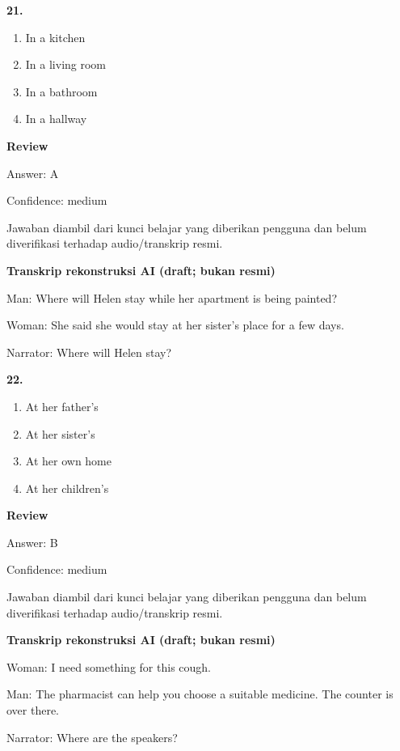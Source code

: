 \documentclass[12pt]{article}
\begin{document}
\noindent\textbf{21.}
\begin{enumerate}[label=(\Alph*),leftmargin=*,itemsep=0.2em]
\item In a kitchen
\item In a living room
\item In a bathroom
\item In a hallway
\end{enumerate}
\par
\begingroup
\setlength{\parskip}{0pt}
\setlength{\parindent}{0pt}
\textbf{Review}\par
Answer: A\par
Confidence: medium\par
Jawaban diambil dari kunci belajar yang diberikan pengguna dan belum diverifikasi terhadap audio/transkrip resmi.\par
\endgroup
\par
\vspace{0.25\baselineskip}
\begin{exampleblock}
\textbf{Transkrip rekonstruksi AI (draft; bukan resmi)}\par
Man: Where will Helen stay while her apartment is being painted?\par
Woman: She said she would stay at her sister's place for a few days.\par
Narrator: Where will Helen stay?\par
\end{exampleblock}
\noindent\textbf{22.}
\begin{enumerate}[label=(\Alph*),leftmargin=*,itemsep=0.2em]
\item At her father's
\item At her sister's
\item At her own home
\item At her children's
\end{enumerate}
\par
\begingroup
\setlength{\parskip}{0pt}
\setlength{\parindent}{0pt}
\textbf{Review}\par
Answer: B\par
Confidence: medium\par
Jawaban diambil dari kunci belajar yang diberikan pengguna dan belum diverifikasi terhadap audio/transkrip resmi.\par
\endgroup
\par
\vspace{0.25\baselineskip}
\begin{exampleblock}
\textbf{Transkrip rekonstruksi AI (draft; bukan resmi)}\par
Woman: I need something for this cough.\par
Man: The pharmacist can help you choose a suitable medicine. The counter is over there.\par
Narrator: Where are the speakers?\par
\end{exampleblock}
\end{document}

